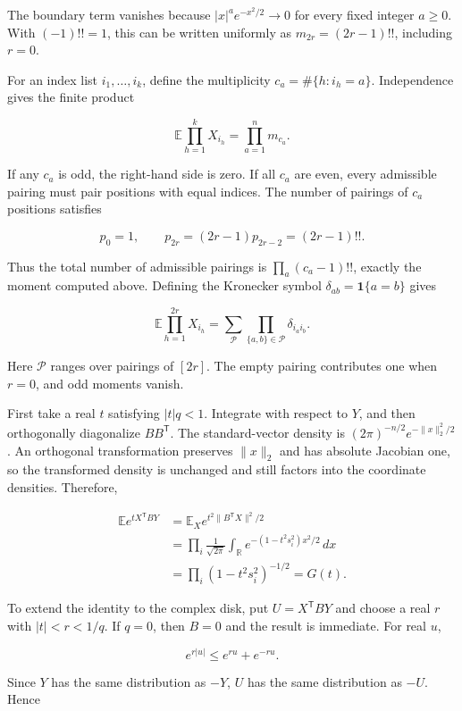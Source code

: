 \documentclass[11pt,a4paper]{article}
\begin{document}
The boundary term vanishes because \(|x|^ae^{-x^2/2}\to0\) for every fixed integer \(a\ge0\). With \((-1)!!=1\), this can be written uniformly as \(m_{2r}=(2r-1)!!\), including \(r=0\).

For an index list \(i_1,\ldots,i_k\), define the multiplicity \(c_a=\#\{h:i_h=a\}\). Independence gives the finite product

\[
\mathbb E\prod_{h=1}^kX_{i_h}=\prod_{a=1}^n m_{c_a}.
\]

If any \(c_a\) is odd, the right-hand side is zero. If all \(c_a\) are even, every admissible pairing must pair positions with equal indices. The number of pairings of \(c_a\) positions satisfies

\[
p_0=1,\qquad p_{2r}=(2r-1)p_{2r-2}
=(2r-1)!!.
\]

Thus the total number of admissible pairings is \(\prod_a(c_a-1)!!\), exactly the moment computed above. Defining the Kronecker symbol \(\delta_{ab}=\mathbf1\{a=b\}\) gives

\[
\mathbb E\prod_{h=1}^{2r}X_{i_h}
=\sum_{\mathcal P}\prod_{\{a,b\}\in\mathcal P}\delta_{i_ai_b}.
\]

Here \(\mathcal P\) ranges over pairings of \([2r]\). The empty pairing contributes one when \(r=0\), and odd moments vanish.

First take a real \(t\) satisfying \(|t|q<1\). Integrate with respect to \(Y\), and then orthogonally diagonalize \(BB^{\mathsf T}\). The standard-vector density is \((2\pi)^{-n/2}e^{-\|x\|_2^2/2}\). An orthogonal transformation preserves \(\|x\|_2\) and has absolute Jacobian one, so the transformed density is unchanged and still factors into the coordinate densities. Therefore,

\[
\begin{aligned}
\mathbb Ee^{tX^{\mathsf T}BY}
&=\mathbb E_Xe^{t^2\|B^{\mathsf T}X\|^2/2}\\
&=\prod_i\frac1{\sqrt{2\pi}}\int_{\mathbb R}
e^{-(1-t^2s_i^2)x^2/2}\,dx\\
&=\prod_i(1-t^2s_i^2)^{-1/2}=G(t).
\end{aligned}
\]

To extend the identity to the complex disk, put \(U=X^{\mathsf T}BY\) and choose a real \(r\) with \(|t|<r<1/q\). If \(q=0\), then \(B=0\) and the result is immediate. For real \(u\),

\[
e^{r|u|}\le e^{ru}+e^{-ru}.
\]

Since \(Y\) has the same distribution as \(-Y\), \(U\) has the same distribution as \(-U\). Hence
\end{document}
